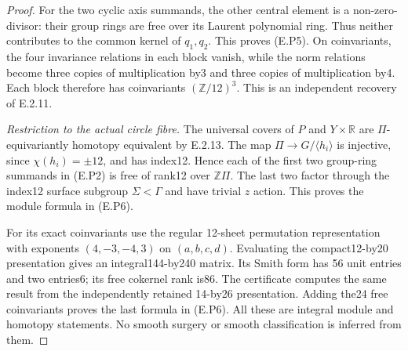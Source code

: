 \begin{proof}
For the two cyclic axis summands, the other
central element is a non-zero-divisor: their
group rings are free over its Laurent polynomial
ring. Thus neither contributes to the common
kernel of $q_1,q_2$. This proves (E.P5). On
coinvariants, the four invariance relations in
each block vanish, while the norm relations
become three copies of multiplication by3 and
three copies of multiplication by4. Each block
therefore has coinvariants $(\mathbb Z/12)^3$.
This is an independent recovery of E.2.11.

\emph{Restriction to the actual circle fibre.}
The universal covers of $P$ and $Y\times\mathbb R$
are $\Pi$-equivariantly homotopy equivalent by
E.2.13. The map $\Pi\to G/\langle h_i\rangle$
is injective, since $\chi(h_i)=\pm12$, and has
index12. Hence each of the first two group-ring
summands in (E.P2) is free of rank12 over
$\mathbb Z\Pi$. The last two factor through the
index12 surface subgroup $\Sigma<\Gamma$ and
have trivial $z$ action. This proves the module
formula in (E.P6).

For its exact coinvariants use the regular
12-sheet permutation representation with
exponents $(4,-3,-4,3)$ on $(a,b,c,d)$.
Evaluating the compact12-by20 presentation gives
an integral144-by240 matrix. Its Smith form has
56 unit entries and two entries6; its free
cokernel rank is86. The certificate computes
the same result from the independently retained
14-by26 presentation. Adding the24 free
coinvariants proves the last formula in (E.P6).
All these are integral module and homotopy
statements. No smooth surgery or smooth
classification is inferred from them.
\end{proof}
